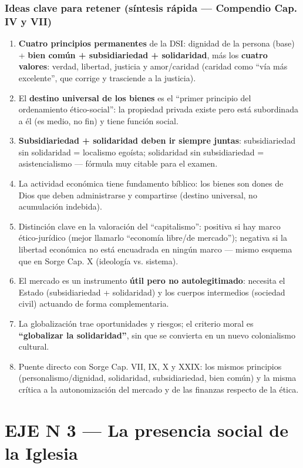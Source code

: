 \documentclass[10pt,a4paper]{article}
\begin{document}
\subsubsection{Ideas clave para retener (síntesis rápida --- Compendio Cap. IV y VII)}
\begin{enumerate}
\item \textbf{Cuatro principios permanentes} de la DSI: dignidad de la persona (base) + \textbf{bien común + subsidiariedad + solidaridad}, más los \textbf{cuatro valores}: verdad, libertad, justicia y amor/caridad (caridad como ``vía más excelente'', que corrige y trasciende a la justicia).
\item El \textbf{destino universal de los bienes} es el ``primer principio del ordenamiento ético-social'': la propiedad privada existe pero está subordinada a él (es medio, no fin) y tiene función social.
\item \textbf{Subsidiariedad + solidaridad deben ir siempre juntas}: subsidiariedad sin solidaridad = localismo egoísta; solidaridad sin subsidiariedad = asistencialismo --- fórmula muy citable para el examen.
\item La actividad económica tiene fundamento bíblico: los bienes son dones de Dios que deben administrarse y compartirse (destino universal, no acumulación indebida).
\item Distinción clave en la valoración del ``capitalismo'': positiva si hay marco ético-jurídico (mejor llamarlo ``economía libre/de mercado''); negativa si la libertad económica no está encuadrada en ningún marco --- mismo esquema que en Sorge Cap. X (ideología vs. sistema).
\item El mercado es un instrumento \textbf{útil pero no autolegitimado}: necesita el Estado (subsidiariedad + solidaridad) y los cuerpos intermedios (sociedad civil) actuando de forma complementaria.
\item La globalización trae oportunidades y riesgos; el criterio moral es \textbf{``globalizar la solidaridad''}, sin que se convierta en un nuevo colonialismo cultural.
\item Puente directo con Sorge Cap. VII, IX, X y XXIX: los mismos principios (personalismo/dignidad, solidaridad, subsidiariedad, bien común) y la misma crítica a la autonomización del mercado y de las finanzas respecto de la ética.
\end{enumerate}



\clearpage\section{EJE N\textordmasculine{} 3 --- La presencia social de la Iglesia}
\end{document}
